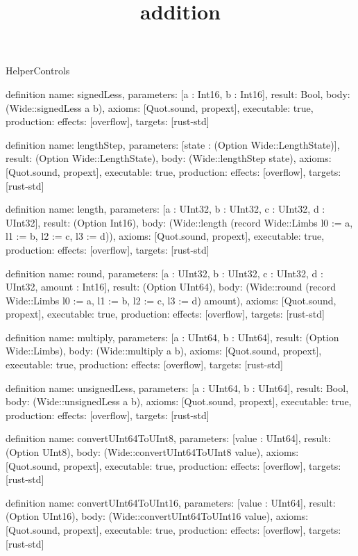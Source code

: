 \begin{lexlean}{HelperControls}
\title{addition}
\begin{semanticmodule}
definition{
  name: signedLess,
  parameters: [a : Int16, b : Int16],
  result: Bool,
  body: (Wide::signedLess a b),
  axioms: [Quot.sound, propext],
  executable: true,
  production: {effects: [overflow], targets: [rust-std]}
}

definition{
  name: lengthStep,
  parameters: [state : (Option Wide::LengthState)],
  result: (Option Wide::LengthState),
  body: (Wide::lengthStep state),
  axioms: [Quot.sound, propext],
  executable: true,
  production: {effects: [overflow], targets: [rust-std]}
}

definition{
  name: length,
  parameters: [a : UInt32, b : UInt32, c : UInt32, d : UInt32],
  result: (Option Int16),
  body: (Wide::length (record Wide::Limbs {l0 := a, l1 := b, l2 := c, l3 := d})),
  axioms: [Quot.sound, propext],
  executable: true,
  production: {effects: [overflow], targets: [rust-std]}
}

definition{
  name: round,
  parameters: [a : UInt32, b : UInt32, c : UInt32, d : UInt32, amount : Int16],
  result: (Option UInt64),
  body: (Wide::round (record Wide::Limbs {l0 := a, l1 := b, l2 := c, l3 := d}) amount),
  axioms: [Quot.sound, propext],
  executable: true,
  production: {effects: [overflow], targets: [rust-std]}
}

definition{
  name: multiply,
  parameters: [a : UInt64, b : UInt64],
  result: (Option Wide::Limbs),
  body: (Wide::multiply a b),
  axioms: [Quot.sound, propext],
  executable: true,
  production: {effects: [overflow], targets: [rust-std]}
}

definition{
  name: unsignedLess,
  parameters: [a : UInt64, b : UInt64],
  result: Bool,
  body: (Wide::unsignedLess a b),
  axioms: [Quot.sound, propext],
  executable: true,
  production: {effects: [overflow], targets: [rust-std]}
}

definition{
  name: convertUInt64ToUInt8,
  parameters: [value : UInt64],
  result: (Option UInt8),
  body: (Wide::convertUInt64ToUInt8 value),
  axioms: [Quot.sound, propext],
  executable: true,
  production: {effects: [overflow], targets: [rust-std]}
}

definition{
  name: convertUInt64ToUInt16,
  parameters: [value : UInt64],
  result: (Option UInt16),
  body: (Wide::convertUInt64ToUInt16 value),
  axioms: [Quot.sound, propext],
  executable: true,
  production: {effects: [overflow], targets: [rust-std]}
}


\end{semanticmodule}
\end{lexlean}
